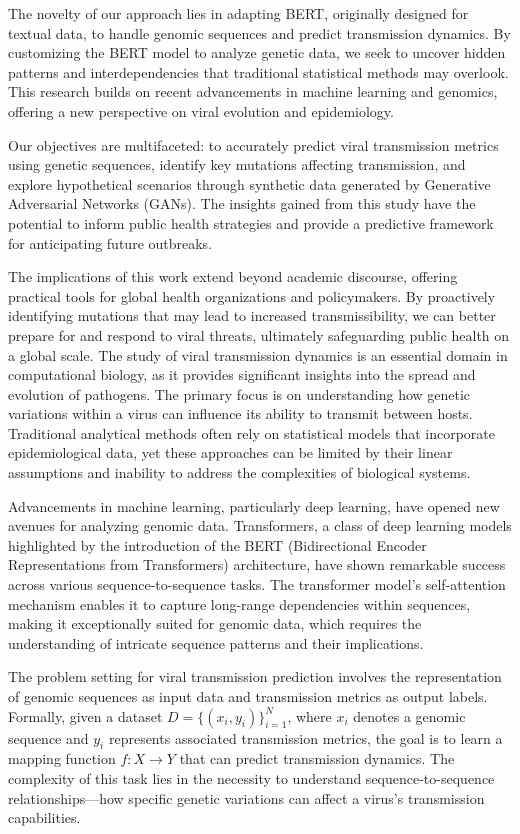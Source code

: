 \documentclass{article}
\begin{document}
The novelty of our approach lies in adapting BERT, originally designed for textual data, to handle genomic sequences and predict transmission dynamics. By customizing the BERT model to analyze genetic data, we seek to uncover hidden patterns and interdependencies that traditional statistical methods may overlook. This research builds on recent advancements in machine learning and genomics, offering a new perspective on viral evolution and epidemiology.

Our objectives are multifaceted: to accurately predict viral transmission metrics using genetic sequences, identify key mutations affecting transmission, and explore hypothetical scenarios through synthetic data generated by Generative Adversarial Networks (GANs). The insights gained from this study have the potential to inform public health strategies and provide a predictive framework for anticipating future outbreaks.

The implications of this work extend beyond academic discourse, offering practical tools for global health organizations and policymakers. By proactively identifying mutations that may lead to increased transmissibility, we can better prepare for and respond to viral threats, ultimately safeguarding public health on a global scale.
The study of viral transmission dynamics is an essential domain in computational biology, as it provides significant insights into the spread and evolution of pathogens. The primary focus is on understanding how genetic variations within a virus can influence its ability to transmit between hosts. Traditional analytical methods often rely on statistical models that incorporate epidemiological data, yet these approaches can be limited by their linear assumptions and inability to address the complexities of biological systems. 

Advancements in machine learning, particularly deep learning, have opened new avenues for analyzing genomic data. Transformers, a class of deep learning models highlighted by the introduction of the BERT (Bidirectional Encoder Representations from Transformers) architecture, have shown remarkable success across various sequence-to-sequence tasks. The transformer model's self-attention mechanism enables it to capture long-range dependencies within sequences, making it exceptionally suited for genomic data, which requires the understanding of intricate sequence patterns and their implications. 

The problem setting for viral transmission prediction involves the representation of genomic sequences as input data and transmission metrics as output labels. Formally, given a dataset \( D = \{(x_i, y_i)\}_{i=1}^{N} \), where \( x_i \) denotes a genomic sequence and \( y_i \) represents associated transmission metrics, the goal is to learn a mapping function \( f: X \rightarrow Y \) that can predict transmission dynamics. The complexity of this task lies in the necessity to understand sequence-to-sequence relationships—how specific genetic variations can affect a virus's transmission capabilities.
\end{document}
